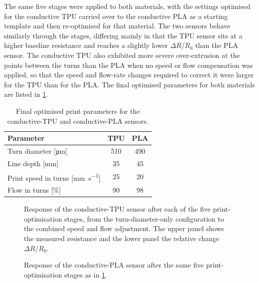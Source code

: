 The same five stages were applied to both materials, with the settings optimised for the conductive TPU carried over to the conductive PLA as a starting template and then re-optimised for that material. The two sensors behave similarly through the stages, differing mainly in that the TPU sensor sits at a higher baseline resistance and reaches a slightly lower $\Delta R / R_0$ than the PLA sensor. The conductive TPU also exhibited more severe over-extrusion at the points between the turns than the PLA when no speed or flow compensation was applied, so that the speed and flow-rate changes required to correct it were larger for the TPU than for the PLA. The final optimised parameters for both materials are listed in \cref{tab:opt_params}.

\begin{table}[!tb]
\centering
\caption{Final optimised print parameters for the conductive-TPU and conductive-PLA sensors.}
\label{tab:opt_params}
\begin{tabular}{@{}l c c@{}}
\toprule
Parameter & TPU & PLA \\
\midrule
Turn diameter [\si{\micro\meter}]            & 510 & 490 \\
Line depth [\si{\milli\meter}]               & 35 & 45 \\
Print speed in turns [\si{\milli\meter\per\second}] & 25 & 20 \\
Flow in turns [\si{\percent}]                & 90 & 98 \\
\bottomrule
\end{tabular}
\end{table}




\begin{figure}[H]
\centering

    \caption{Response of the conductive-TPU sensor after each of the five print-optimisation stages, from the turn-diameter-only configuration to the combined speed and flow adjustment. The upper panel shows the measured resistance and the lower panel the relative change $\Delta R/R_0$.}
    \label{fig:opt_tpu}
\end{figure}

\begin{figure}[H]
\centering

    \caption{Response of the conductive-PLA sensor after the same five print-optimisation stages as in \cref{fig:opt_tpu}.}
    \label{fig:opt_pla}
\end{figure}



